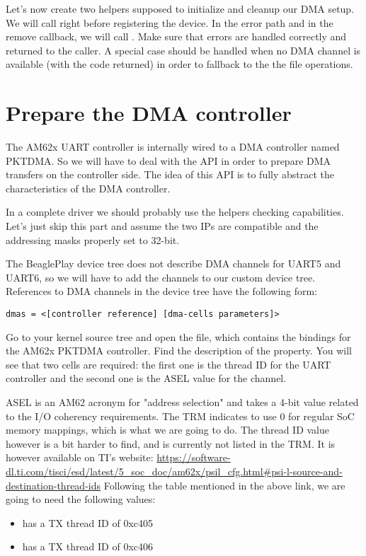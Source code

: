 Let's now create two helpers supposed to initialize and cleanup our DMA
setup. We will call  right before registering
the  device. In the  error path and in the
remove callback, we will call . Make sure that errors
are handled correctly and returned to the caller. A special case should be
handled when no DMA channel is available (with the  code returned)
in order to fallback to the the  file operations.

\section{Prepare the DMA controller}

The AM62x UART controller is internally wired to a DMA controller named PKTDMA.
So we will have to deal with the  API in order to prepare DMA
transfers on the controller side. The idea of this API is to fully abstract the
characteristics of the DMA controller.

In a complete driver we should probably use the helpers checking
capabilities. Let's just skip this part and assume the two IPs are
compatible and the addressing masks properly set to 32-bit.

The BeaglePlay device tree does not describe DMA channels for UART5 and UART6,
so we will have to add the channels to our custom device tree. References to DMA channels in the device tree have the following form:

\begin{verbatim}
dmas = <[controller reference] [dma-cells parameters]>
\end{verbatim}

Go to your kernel source tree and open the  file, which contains the bindings for the AM62x PKTDMA controller. Find the description of the  property. You will see that two cells are required: the first one is the thread ID for the UART controller and the second one is the ASEL value for the channel.

ASEL is an AM62 acronym for "address selection" and takes a 4-bit value related to
the I/O coherency requirements. The TRM indicates to use 0 for regular SoC
memory mappings, which is what we are going to do. The thread ID value however
is a bit harder to find, and is currently not listed in the TRM. It is however
available on TI's website:
\url{https://software-dl.ti.com/tisci/esd/latest/5_soc_doc/am62x/psil_cfg.html#psi-l-source-and-destination-thread-ids}
Following the table mentioned in the above link, we are going to need the
following values:
\begin{itemize}
\item {} has a TX thread ID of 0xc405
\item {} has a TX thread ID of 0xc406
\end{itemize}

